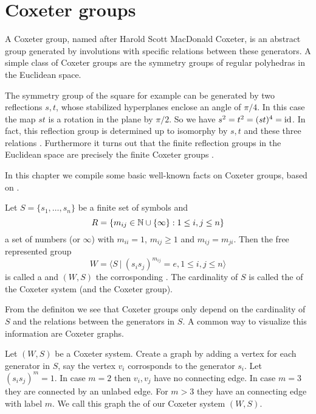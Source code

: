 \section{Coxeter groups}
\label{sec:coxeter-groups}

A Coxeter group, named after Harold Scott MacDonald Coxeter, is an abstract group generated by involutions with specific relations between these generators. A simple class of Coxeter groups are the symmetry groups of regular polyhedras in the Euclidean space.

The symmetry group of the square for example can be generated by two reflections $s,t$, whose stabilized hyperplanes enclose an angle of $\pi / 4$. In this case the map $st$ is a rotation in the plane by $\pi / 2$. So we have $s^2 = t^2 = (st)^4 = \operatorname{id}$. In fact, this reflection group is determined up to isomorphy by $s,t$ and these three relations \cite[Theorem 1.9]{humphreys:coxeter}. Furthermore it turns out that the finite reflection groups in the Euclidean space are precisely the finite Coxeter groups \cite[Theorem 6.4]{humphreys:coxeter}.

In this chapter we compile some basic well-known facts on Coxeter groups, based on \cite{humphreys:coxeter}.

\begin{defi}
	Let $S = \{ s_1, \ldots, s_n \}$ be a finite set of symbols and
	$$R = \{ m_{ij} \in \mathbb{N} \cup \{\infty\} : 1 \leq i,j \leq n \}$$
	a set of numbers (or $\infty$) with $m_{ii} = 1$, $m_{ij} \geq 1$ and $m_{ij} = m_{ji}$. Then the free represented group
	$$W = \langle S \ | \ (s_i s_j)^{m_{ij}} = e, 1 \leq i,j \leq n \rangle$$
	is called a  and $(W,S)$ the corrosponding . The cardinality of $S$ is called the  of the Coxeter system (and the Coxeter group).
\end{defi}

From the definiton we see that Coxeter groups only depend on the cardinality of $S$ and the relations between the generators in $S$. A common way to visualize this information are Coxeter graphs.

\begin{defi}
	Let $(W,S)$ be a Coxeter system. Create a graph by adding a vertex for each generator in $S$, say the vertex $v_i$ corrosponds to the generator $s_i$. Let $(s_i s_j)^m = 1$. In case $m = 2$ then $v_i,v_j$ have no connecting edge. In case $m = 3$ they are connected by an unlabed edge. For $m > 3$ they have an connecting edge with label $m$. We call this graph the  of our Coxeter system $(W,S)$.
\end{defi}


